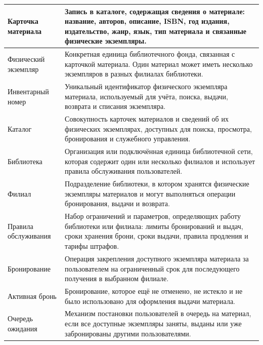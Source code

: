 \documentclass[12pt,a4paper]{article}
\begin{document}
\begin{xltabular}{\textwidth}{
			|>{\raggedright\arraybackslash}p{4.2cm}
			|>{\raggedright\arraybackslash}X|
		}
		Карточка материала & Запись в каталоге, содержащая сведения о материале:
		название, авторов, описание, ISBN, год издания, издательство, жанр,
		язык, тип материала и связанные физические экземпляры. \\
		\hline
		
		Физический экземпляр & Конкретная единица библиотечного фонда,
		связанная с карточкой материала. Один материал может иметь несколько
		экземпляров в разных филиалах библиотеки. \\
		\hline
		
		Инвентарный номер & Уникальный идентификатор физического экземпляра
		материала, используемый для учёта, поиска, выдачи, возврата и списания
		экземпляра. \\
		\hline
		
		Каталог & Совокупность карточек материалов и сведений об их физических
		экземплярах, доступных для поиска, просмотра, бронирования и служебного
		управления. \\
		\hline
		
		Библиотека & Организация или подключённая единица библиотечной сети,
		которая содержит один или несколько филиалов и использует правила
		обслуживания пользователей. \\
		\hline
		
		Филиал & Подразделение библиотеки, в котором хранятся физические
		экземпляры материалов и могут выполняться операции бронирования,
		выдачи и возврата. \\
		\hline
		
		Правила обслуживания & Набор ограничений и параметров, определяющих
		работу библиотеки или филиала: лимиты бронирований и выдач, сроки
		хранения брони, сроки выдачи, правила продления и тарифы штрафов. \\
		\hline
		
		Бронирование & Операция закрепления доступного экземпляра
		материала за пользователем на ограниченный срок для последующего
		получения в выбранном филиале. \\
		\hline
		
		Активная бронь & Бронирование, которое ещё не отменено, не истекло
		и не было использовано для оформления выдачи материала. \\
		\hline
		
		Очередь ожидания & Механизм постановки пользователей в очередь на
		материал, если все доступные экземпляры заняты, выданы или уже
		забронированы другими пользователями. \\
		\hline
		

\end{xltabular}
\end{document}
